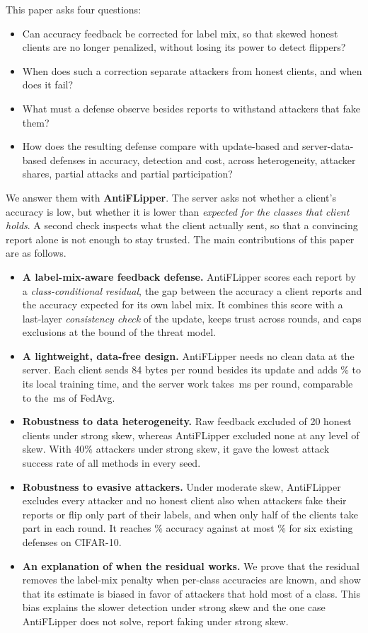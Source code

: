 \documentclass[journal]{IEEEtran}
\begin{document}
This paper asks four questions:
\begin{itemize}
\item[\textbf{Q1}] Can accuracy feedback be corrected for label mix, so that skewed honest clients are no longer penalized, without losing its power to detect flippers?
\item[\textbf{Q2}] When does such a correction separate attackers from honest clients, and when does it fail?
\item[\textbf{Q3}] What must a defense observe besides reports to withstand attackers that fake them?
\item[\textbf{Q4}] How does the resulting defense compare with update-based and server-data-based defenses in accuracy, detection and cost, across heterogeneity, attacker shares, partial attacks and partial participation?
\end{itemize}

We answer them with \textbf{AntiFLipper}. The server asks not whether a client's accuracy is low, but whether it is lower than \emph{expected for the classes that client holds}. A second check inspects what the client actually sent, so that a convincing report alone is not enough to stay trusted. The main contributions of this paper are as follows.
\begin{itemize}
\item \textbf{A label-mix-aware feedback defense.} AntiFLipper scores each report by a \emph{class-conditional residual}, the gap between the accuracy a client reports and the accuracy expected for its own label mix. It combines this score with a last-layer \emph{consistency check} of the update, keeps trust across rounds, and caps exclusions at the bound of the threat model.
\item \textbf{A lightweight, data-free design.} AntiFLipper needs no clean data at the server. Each client sends 84 bytes per round besides its update and adds \evalOverhead\% to its local training time, and the server work takes \matchedOurs\,ms per round, comparable to the \matchedFedAvg\,ms of FedAvg.
\item \textbf{Robustness to data heterogeneity.} Raw feedback excluded \cleanHonRaw{} of 20 honest clients under strong skew, whereas AntiFLipper excluded none at any level of skew. With 40\% attackers under strong skew, it gave the lowest attack success rate of all methods in every seed.
\item \textbf{Robustness to evasive attackers.} Under moderate skew, AntiFLipper excludes every attacker and no honest client also when attackers fake their reports or flip only part of their labels, and when only half of the clients take part in each round. It reaches \headAcc\% accuracy against at most \headAccFLTrust\% for six existing defenses on CIFAR-10.
\item \textbf{An explanation of when the residual works.} We prove that the residual removes the label-mix penalty when per-class accuracies are known, and show that its estimate is biased in favor of attackers that hold most of a class. This bias explains the slower detection under strong skew and the one case AntiFLipper does not solve, report faking under strong skew.
\end{itemize}
\end{document}
